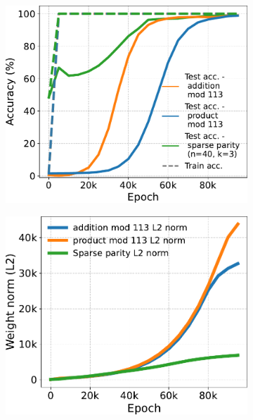 \begin{figure}[t]
\begin{subfigure}[t]{.32\textwidth}
    \includegraphics[width=\linewidth]{grokking_iclr_arxiv/figures/stablemax_grokking.pdf}
    \label{fig:stablemax_grokking}
\end{subfigure}
\hfill
\begin{subfigure}[t]{.32\textwidth}
    \includegraphics[width=\linewidth]{grokking_iclr_arxiv/figures/weight_norms.pdf}
    \label{fig:weight_norms}
\end{subfigure}

\end{figure}
